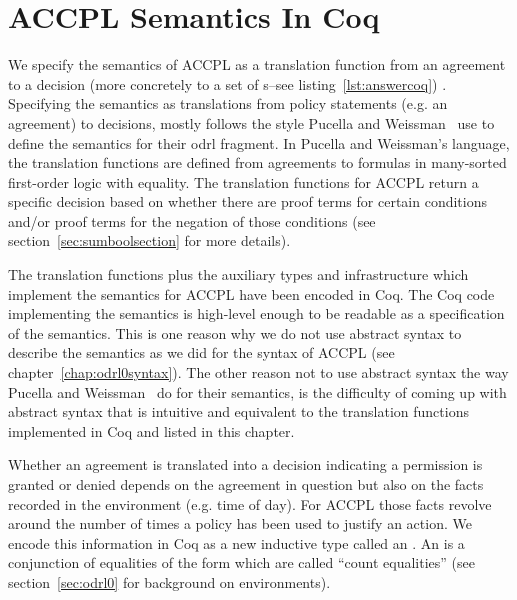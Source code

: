 \chapter{ACCPL Semantics In Coq}\label{chap:accplsemanticscoq}

We specify the semantics of \ac{ACCPL} as a translation function from an agreement to a decision (more concretely to a set of s--see listing~\ref{lst:answercoq}) . Specifying the semantics as translations from policy statements (e.g. an agreement) to decisions, mostly follows the style Pucella and Weissman~\cite{pucella2006} use to define the semantics for their \ac{odrl} fragment. In Pucella and Weissman's language, the translation functions are defined from agreements to formulas in many-sorted first-order logic with equality. The translation functions for \ac{ACCPL} return a specific decision based on whether there are proof terms for certain conditions and/or proof terms for the negation of those conditions (see section~\ref{sec:sumboolsection} for more details).
 

The translation functions plus the auxiliary types and infrastructure which implement the semantics for \ac{ACCPL} have been encoded in Coq. The Coq code implementing the semantics is high-level enough to be readable as a specification of the semantics. This is one reason why we do not use abstract syntax to describe the semantics as we did for the syntax of \ac{ACCPL} (see chapter~\ref{chap:odrl0syntax}). The other reason not to use abstract syntax the way Pucella and Weissman~\cite{pucella2006} do for their semantics, is the difficulty of coming up with abstract syntax that is intuitive and equivalent to the translation functions implemented in Coq and listed in this chapter.

Whether an agreement is translated into a decision indicating a permission is granted or denied depends on the agreement in question but also on the facts recorded in the environment (e.g. time of day). For \ac{ACCPL} those facts revolve around the number of times a policy has been used to justify an action. We encode this information in Coq as a new inductive type called an . An  is a conjunction of equalities of the form  which are called ``count equalities'' (see section~\ref{sec:odrl0} for background on environments).

